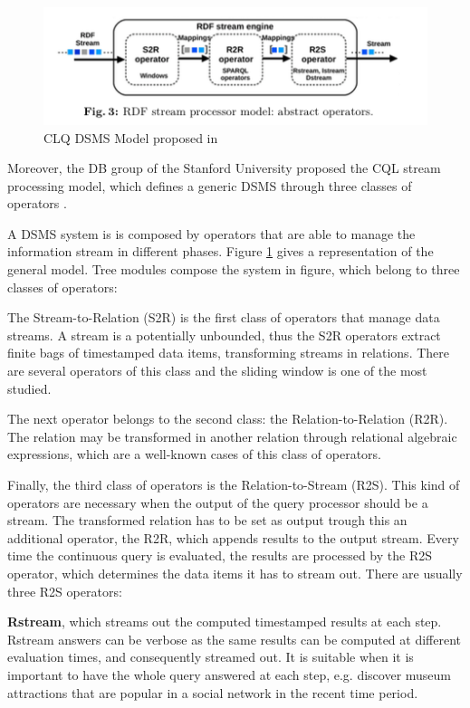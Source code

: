\begin{figure}[tbh]
  \centering
	\includegraphics[width=\linewidth]{images/cql}
	\caption{CLQ DSMS Model proposed in  \cite{Arasu2006} } 
  	\label{fig:cql}
\end{figure}


Moreover, the DB group of the Stanford University proposed the CQL stream processing model, which defines a generic DSMS through three classes of operators \cite{Arasu2006}.

A DSMS system is is composed by operators that are able to manage the information stream in different phases. Figure \ref{fig:cql} gives a representation of the general model. Tree modules compose the system in figure, which belong to three classes of operators:  

The Stream-to-Relation (S2R) is the first class of operators that manage data streams.  A stream is a potentially unbounded, thus the S2R operators extract finite bags of timestamped data items, transforming streams in relations. There are several operators of this class and the sliding window is one of the most studied. 

The next operator belongs to the second class: the Relation-to-Relation (R2R). The relation may be transformed in another relation through relational algebraic expressions, which are a well-known cases of this class of operators. 

Finally, the third class of operators is the Relation-to-Stream (R2S). This kind of operators are necessary when the output of the query processor should be a stream. The transformed relation has to be set as output trough this an additional operator, the R2R, which appends results to the output stream. Every time the continuous query is evaluated, the results are processed by the R2S operator, which determines the data items it has to stream out. There are usually three R2S operators:

\textbf{Rstream}, which streams out the computed timestamped results at each step. Rstream answers can be verbose as the same results can be computed at different evaluation times, and consequently streamed out. It is suitable when it is important to have the whole query answered at each step, e.g. discover museum attractions that are popular in a social network in the recent time period.

